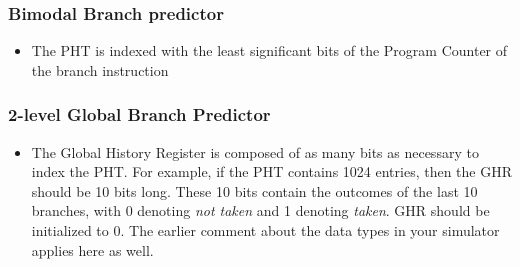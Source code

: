 \documentclass[a4paper,12pt]{article}
\theoremstyle{plain}
\begin{document}
\subsubsection*{Bimodal Branch predictor}

\begin{itemize}
\item  The PHT is indexed with the least significant bits of the Program Counter of the branch instruction
\end{itemize} 

\subsubsection*{2-level Global Branch Predictor}
\begin{itemize}
\item The Global History Register is composed of as many bits as  necessary to index the PHT. For example, if the PHT contains 1024 entries, then the GHR should be 10 bits long. These 10 bits contain the outcomes of the last 10 branches, with 0 denoting {\em not taken} and 1 denoting {\em taken}. GHR should be initialized to 0. The earlier comment about the data types in your simulator applies here as well. 

\end{itemize}
\end{document}
